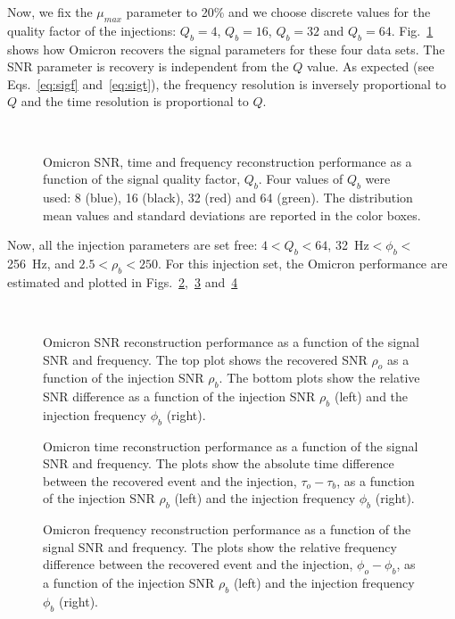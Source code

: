 Now, we fix the $\mu_{max}$ parameter to 20\% and we choose discrete values for the quality factor of the injections: $Q_b=4$, $Q_b=16$, $Q_b=32$ and $Q_b=64$. Fig.~\ref{fig:char_q} shows how Omicron recovers the signal parameters for these four data sets. The SNR parameter is recovery is independent from the $Q$ value. As expected (see Eqs.~\ref{eq:sigf} and~\ref{eq:sigt}), the frequency resolution is inversely proportional to $Q$ and the time resolution is proportional to $Q$.
\begin{figure}
  \center
   \\
  \caption{Omicron SNR, time and frequency reconstruction performance as a function of the signal quality factor, $Q_b$. Four values of $Q_b$ were used: 8 (blue), 16 (black), 32 (red) and 64 (green). The distribution mean values and standard deviations are reported in the color boxes.}
  \label{fig:char_q}
\end{figure}

Now, all the injection parameters are set free: $4<Q_b<64$, 32~Hz$<\phi_b<$256~Hz, and $2.5<\rho_b<250$. For this injection set, the Omicron performance are estimated and plotted in Figs.~\ref{fig:char_snr},~\ref{fig:char_time} and~\ref{fig:char_freq}
\begin{figure}
  \center
   \\
  \caption{Omicron SNR reconstruction performance as a function of the signal SNR and frequency. The top plot shows the recovered SNR $\rho_o$ as a function of the injection SNR $\rho_b$. The bottom plots show the relative SNR difference as a function of the injection SNR $\rho_b$ (left) and the injection frequency $\phi_b$ (right).}
  \label{fig:char_snr}
\end{figure}

\begin{figure}
  \center
  \caption{Omicron time reconstruction performance as a function of the signal SNR and frequency. The plots show the absolute time difference between the recovered event and the injection, $\tau_o-\tau_b$, as a function of the injection SNR $\rho_b$ (left) and the injection frequency $\phi_b$ (right).}
  \label{fig:char_time}
\end{figure}


\begin{figure}
  \center
  \caption{Omicron frequency reconstruction performance as a function of the signal SNR and frequency. The plots show the relative frequency difference between the recovered event and the injection, $\phi_o-\phi_b$, as a function of the injection SNR $\rho_b$ (left) and the injection frequency $\phi_b$ (right).}
  \label{fig:char_freq}
\end{figure}
